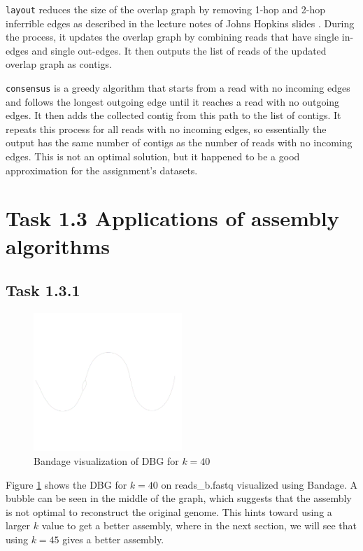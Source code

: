 \documentclass[12pt]{article}
\begin{document}
\texttt{layout} reduces the size of the overlap graph by removing 1-hop and 2-hop inferrible edges as described in the lecture notes of Johns Hopkins slides \cite{olc_lecture_notes}. During the process, it updates the overlap graph by combining reads that have single in-edges and single out-edges. It then outputs the list of reads of the updated overlap graph as contigs.

\texttt{consensus} is a greedy algorithm that starts from a read with no incoming edges and follows the longest outgoing edge until it reaches a read with no outgoing edges. It then adds the collected contig from this path to the list of contigs. It repeats this process for all reads with no incoming edges, so essentially the output has the same number of contigs as the number of reads with no incoming edges. This is not an optimal solution, but it happened to be a good approximation for the assignment's datasets.



\section{Task 1.3 Applications of assembly algorithms}

\subsection{Task 1.3.1}

\begin{figure}[h!]
    \centering
    \includegraphics[width=0.5\textwidth]{../toy_dataset/reads_b_k_40.png}
    \caption{Bandage visualization of DBG for $k=40$}
    \label{fig:dbg_k_40}
\end{figure} 

Figure \ref{fig:dbg_k_40} shows the DBG for $k=40$ on reads\_b.fastq visualized using Bandage. A bubble can be seen in the middle of the graph, which suggests that the assembly is not optimal to reconstruct the original genome.
This hints toward using a larger $k$ value to get a better assembly, where in the next section, we will see that using $k=45$ gives a better assembly.
\end{document}

